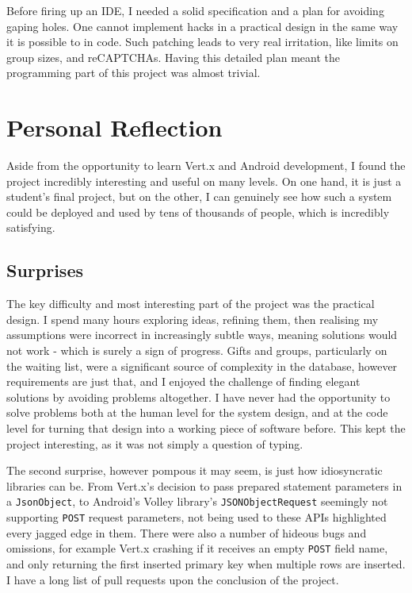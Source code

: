 \documentclass[12pt,a4paper]{bhamdissertation}
\newcommand{\code}[1]{\texttt{#1}}
\begin{document}
Before firing up an IDE, I needed a solid specification and a plan for avoiding gaping holes. One cannot implement hacks in a practical design in the same way it is possible to in code. Such patching leads to very real irritation, like limits on group sizes, and reCAPTCHAs. Having this detailed plan meant the programming part of this project was almost trivial.

\section{Personal Reflection}

Aside from the opportunity to learn Vert.x and Android development, I found the project incredibly interesting and useful on many levels. On one hand, it is just a student's final project, but on the other, I can genuinely see how such a system could be deployed and used by tens of thousands of people, which is incredibly satisfying.

\subsection{Surprises}

The key difficulty and most interesting part of the project was the practical design. I spend many hours exploring ideas, refining them, then realising my assumptions were incorrect in increasingly subtle ways, meaning solutions would not work - which is surely a sign of progress. Gifts and groups, particularly on the waiting list, were a significant source of complexity in the database, however requirements are just that, and I enjoyed the challenge of finding elegant solutions by avoiding problems altogether. I have never had the opportunity to solve problems both at the human level for the system design, and at the code level for turning that design into a working piece of software before. This kept the project interesting, as it was not simply a question of typing. 

The second surprise, however pompous it may seem, is just how idiosyncratic libraries can be. From Vert.x's decision to pass prepared statement parameters in a \code{JsonObject}, to Android's Volley library's \code{JSONObjectRequest} seemingly not supporting \code{POST} request parameters, not being used to these APIs highlighted every jagged edge in them. There were also a number of hideous bugs and omissions, for example Vert.x crashing if it receives an empty \code{POST} field name, and only returning the first inserted primary key when multiple rows are inserted. I have a long list of pull requests upon the conclusion of the project.
\end{document}
